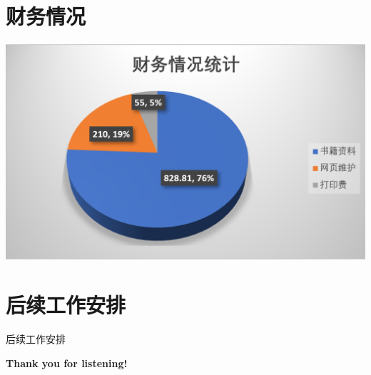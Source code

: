 \documentclass[10pt]{beamer}
\begin{document}
\section{财务情况}
  \begin{frame}{ }
  \includegraphics[height=0.66\paperheight]{finance}
  \end{frame}


\section{后续工作安排}
  \begin{frame}{后续工作安排}

  \end{frame}




\begin{frame}
\textbf{Thank you for listening!}
\end{frame}
\end{document}
